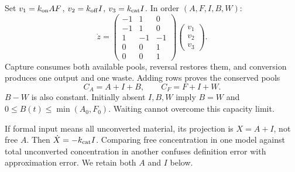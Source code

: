 Set $v_1=k_{\rm on}AF$, $v_2=k_{\rm off}I$, $v_3=k_{\rm cat}I$.
In order $(A,F,I,B,W)$:
\begin{equation}
 \dot z=
 \begin{pmatrix}-1&1&0\\-1&1&0\\1&-1&-1\\0&0&1\\0&0&1\end{pmatrix}
 \begin{pmatrix}v_1\\v_2\\v_3\end{pmatrix}.
 \label{eq:dna31-stoich}
\end{equation}
Capture consumes both available pools, reversal restores them, and conversion
produces one output and one waste. Adding rows proves the conserved pools
\begin{equation}
 C_A=A+I+B,\qquad C_F=F+I+W.
 \label{eq:dna31-pools}
\end{equation}
$B-W$ is also constant. Initially absent $I,B,W$ imply $B=W$ and
$0\le B(t)\le\min(A_0,F_0)$. Waiting cannot overcome this capacity limit.

If formal input means all unconverted material, its projection is $X=A+I$,
not free $A$. Then $\dot X=-k_{\rm cat}I$. Comparing free concentration in one
model against total unconverted concentration in another confuses definition
error with approximation error. We retain both $A$ and $I$ below.

